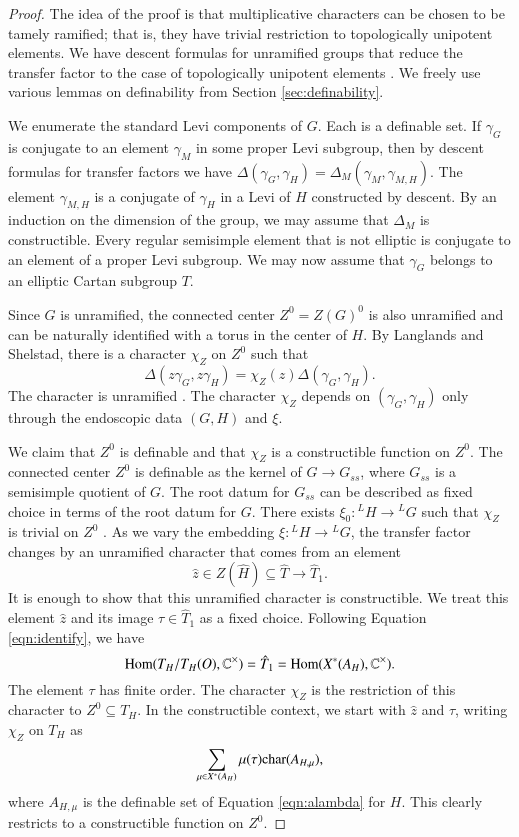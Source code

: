 \begin{proof}  
  The idea of the proof is that
  multiplicative characters can be chosen to be tamely ramified; that
  is, they have trivial restriction to topologically unipotent
  elements.  We have descent formulas for unramified groups that
  reduce the transfer factor to the case of topologically unipotent
  elements \cite{langlands2007descent} \cite{hales1993simple}
  \cite{langlands2007descent}.
  We freely use various lemmas on definability from Section
  \ref{sec:definability}.

  We enumerate the standard Levi components of $G$.  Each is a
  definable set.  If $\gamma_G$ is conjugate to an element $\gamma_M$
  in some proper Levi subgroup, then by descent formulas for transfer
  factors we have $\Delta(\gamma_G,\gamma_H) =
  \Delta_M(\gamma_M,\gamma_{M,H})$.  The element $\gamma_{M,H}$ is a
  conjugate of $\gamma_H$ in a Levi of $H$ constructed by descent.  By
  an induction on the dimension of the group, we may assume that
  $\Delta_M$ is constructible.  Every regular semisimple element that
  is not elliptic is conjugate to an element of a proper Levi
  subgroup.  We may now assume that $\gamma_G$ belongs to an elliptic
  Cartan subgroup $T$.

  Since $G$ is unramified, the connected center $Z^0 = Z(G)^0$ is also
  unramified and can be naturally identified with a torus in the
  center of $H$.  By Langlands and Shelstad, there is a character
  $\chi_Z$ on $Z^0$ such that
\[
\Delta(z\gamma_G,z\gamma_H) = \chi_Z(z)\Delta(\gamma_G,\gamma_H).
\]
The character is unramified \cite{hales1993simple}.  The character
$\chi_Z$ depends on $(\gamma_G,\gamma_H)$ only through the endoscopic
data $(G,H)$ and $\xi$.  

We claim that $Z^0$ is definable and that $\chi_Z$ is a constructible
function on $Z^0$.  The connected center $Z^0$ is definable as the
kernel of $G\to G_{ss}$, where $G_{ss}$ is a semisimple quotient of
$G$.  The root datum for $G_{ss}$ can be described as 
fixed choice in terms of the root datum for $G$.
There exists $\xi_0:{}^LH\to {}^LG$ such that $\chi_Z$ is
trivial on $Z^0$ \cite[Lemma 3.6]{hales1995fundamental}.  As we vary
the embedding $\xi:{}^LH\to{}^LG$, the transfer factor changes by an
unramified character that comes from an element
\[
\hat z\in Z(\hat H) \subseteq \hat T \to \hat T_1.
\]
It is enough to show that this unramified character is constructible.
We treat this element $\hat z$ and its image $\tau\in \hat T_1$ as a
fixed choice.  Following Equation \ref{eqn:identify}, we have
\[
{\operatorname{Hom}}(T_H/T_H(O),\mathbb{C}^\times) 
= \hat T_1 = {\operatorname{Hom}}(X^*(A_H),\mathbb{C}^\times).
\]
The element $\tau$ has finite order.  The character $\chi_Z$ is the
restriction of this character to $Z^0 \subseteq T_H$.  In the
constructible context, we start with $\hat z$ and $\tau$, writing
$\chi_Z$ on $T_H$ as
\[
\sum_{\mu\in X^*(A_H)} \mu(\tau){\operatorname{char}}(A_{H,\mu}),
\]
where $A_{H,\mu}$ is the definable set of Equation \ref{eqn:alambda}
for $H$.  This clearly restricts to a constructible function on $Z^0$.


\end{proof}
